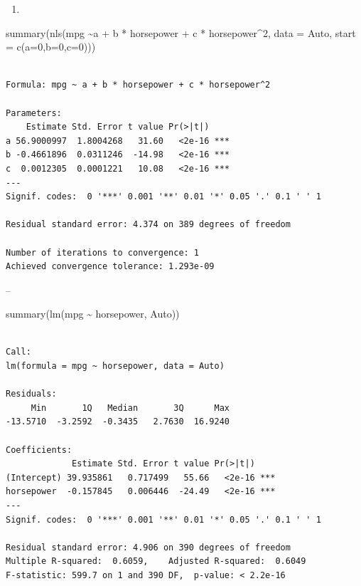 \documentclass[
  letterpaper,
  DIV=11,
  numbers=noendperiod]{scrreprt}
\newenvironment{Shaded}{\begin{snugshade}}{\end{snugshade}}
\newcommand{\AttributeTok}[1]{\textcolor[rgb]{0.65,0.35,0.00}{#1}}
\newcommand{\DecValTok}[1]{\textcolor[rgb]{0.47,0.16,0.63}{#1}}
\newcommand{\FunctionTok}[1]{\textcolor[rgb]{0.02,0.16,0.49}{#1}}
\newcommand{\NormalTok}[1]{\textcolor[rgb]{0.33,0.33,0.33}{#1}}
\newcommand{\SpecialCharTok}[1]{\textcolor[rgb]{0.00,0.46,0.62}{#1}}
\providecommand{\tightlist}{%
  \setlength{\itemsep}{0pt}\setlength{\parskip}{0pt}}\usepackage{longtable,booktabs,array}
\begin{document}
\begin{enumerate}
\def\labelenumi{\arabic{enumi}.}
\setcounter{enumi}{3}
\tightlist
\item
\end{enumerate}

\begin{Shaded}
\begin{Highlighting}[]
\FunctionTok{summary}\NormalTok{(}\FunctionTok{nls}\NormalTok{(mpg }\SpecialCharTok{\textasciitilde{}}\NormalTok{a }\SpecialCharTok{+}\NormalTok{ b }\SpecialCharTok{*}\NormalTok{ horsepower }\SpecialCharTok{+}\NormalTok{ c }\SpecialCharTok{*}\NormalTok{ horsepower}\SpecialCharTok{\^{}}\DecValTok{2}\NormalTok{, }\AttributeTok{data =}\NormalTok{ Auto, }\AttributeTok{start =} \FunctionTok{c}\NormalTok{(}\AttributeTok{a=}\DecValTok{0}\NormalTok{,}\AttributeTok{b=}\DecValTok{0}\NormalTok{,}\AttributeTok{c=}\DecValTok{0}\NormalTok{)))}
\end{Highlighting}
\end{Shaded}

\begin{verbatim}

Formula: mpg ~ a + b * horsepower + c * horsepower^2

Parameters:
    Estimate Std. Error t value Pr(>|t|)    
a 56.9000997  1.8004268   31.60   <2e-16 ***
b -0.4661896  0.0311246  -14.98   <2e-16 ***
c  0.0012305  0.0001221   10.08   <2e-16 ***
---
Signif. codes:  0 '***' 0.001 '**' 0.01 '*' 0.05 '.' 0.1 ' ' 1

Residual standard error: 4.374 on 389 degrees of freedom

Number of iterations to convergence: 1 
Achieved convergence tolerance: 1.293e-09
\end{verbatim}

--

\begin{Shaded}
\begin{Highlighting}[]
\FunctionTok{summary}\NormalTok{(}\FunctionTok{lm}\NormalTok{(mpg }\SpecialCharTok{\textasciitilde{}}\NormalTok{ horsepower, Auto))}
\end{Highlighting}
\end{Shaded}

\begin{verbatim}

Call:
lm(formula = mpg ~ horsepower, data = Auto)

Residuals:
     Min       1Q   Median       3Q      Max 
-13.5710  -3.2592  -0.3435   2.7630  16.9240 

Coefficients:
             Estimate Std. Error t value Pr(>|t|)    
(Intercept) 39.935861   0.717499   55.66   <2e-16 ***
horsepower  -0.157845   0.006446  -24.49   <2e-16 ***
---
Signif. codes:  0 '***' 0.001 '**' 0.01 '*' 0.05 '.' 0.1 ' ' 1

Residual standard error: 4.906 on 390 degrees of freedom
Multiple R-squared:  0.6059,    Adjusted R-squared:  0.6049 
F-statistic: 599.7 on 1 and 390 DF,  p-value: < 2.2e-16
\end{verbatim}
\end{document}
